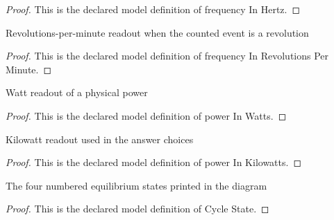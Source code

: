 \begin{proof}
  This is the declared model definition of frequency In Hertz.
\end{proof}
\begin{definition}
  \label{def:physics:phyx-mini-0438:phyxminiproblems-problemphyxmini0438-frequencyinrevolutionsperminute}
  Revolutions-per-minute readout when the counted event is a revolution
\end{definition}
\begin{proof}
  This is the declared model definition of frequency In Revolutions Per Minute.
\end{proof}
\begin{definition}
  \label{def:physics:phyx-mini-0438:phyxminiproblems-problemphyxmini0438-powerinwatts}
  Watt readout of a physical power
\end{definition}
\begin{proof}
  This is the declared model definition of power In Watts.
\end{proof}
\begin{definition}
  \label{def:physics:phyx-mini-0438:phyxminiproblems-problemphyxmini0438-powerinkilowatts}
  Kilowatt readout used in the answer choices
\end{definition}
\begin{proof}
  This is the declared model definition of power In Kilowatts.
\end{proof}
\begin{definition}
  \label{def:physics:phyx-mini-0438:phyxminiproblems-problemphyxmini0438-cyclestate}
  The four numbered equilibrium states printed in the diagram
\end{definition}
\begin{proof}
  This is the declared model definition of Cycle State.
\end{proof}
